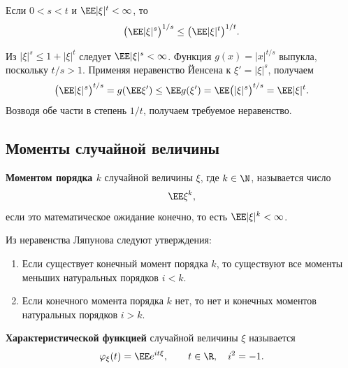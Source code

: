 \begin{theorem}
    Если $0<s<t$ и $\EE|\xi|^t<\infty$, то
    \[
        \bigl(\EE|\xi|^s\bigr)^{1/s}
        \leq\bigl(\EE|\xi|^t\bigr)^{1/t}.
    \]
\end{theorem}

\begin{Proof}
    Из $|\xi|^s\leq1+|\xi|^t$ следует $\EE|\xi|^s<\infty$.
    Функция $g(x)=|x|^{t/s}$ выпукла, поскольку $t/s>1$.
    Применяя неравенство Йенсена к $\xi'=|\xi|^s$, получаем
    \[
        \bigl(\EE|\xi|^s\bigr)^{t/s}
        =g(\EE\xi')\leq\EE g(\xi')
        =\EE\bigl(|\xi|^s\bigr)^{t/s}=\EE|\xi|^t.
    \]
    Возводя обе части в степень $1/t$, получаем требуемое неравенство.
\end{Proof}

\subsection{Моменты случайной величины}

\begin{definition}
    \textbf{Моментом порядка $k$} случайной величины $\xi$, где
    $k\in\N$, называется число
    \[
        \EE\xi^k,
    \]
    если это математическое ожидание конечно, то есть
    $\EE|\xi|^k<\infty$.
\end{definition}

\begin{consequence}
    Из неравенства Ляпунова следуют утверждения:
    \begin{enumerate}
        \item Если существует конечный момент порядка $k$, то существуют
        все моменты меньших натуральных порядков $i<k$.
        \item Если конечного момента порядка $k$ нет, то нет и конечных
        моментов натуральных порядков $i>k$.
    \end{enumerate}
\end{consequence}

\begin{definition}
    \textbf{Характеристической функцией} случайной величины $\xi$ называется
    \[
        \varphi_\xi(t)=\EE e^{it\xi},\qquad t\in\R,\quad i^2=-1.
    \]
\end{definition}
\endgroup
